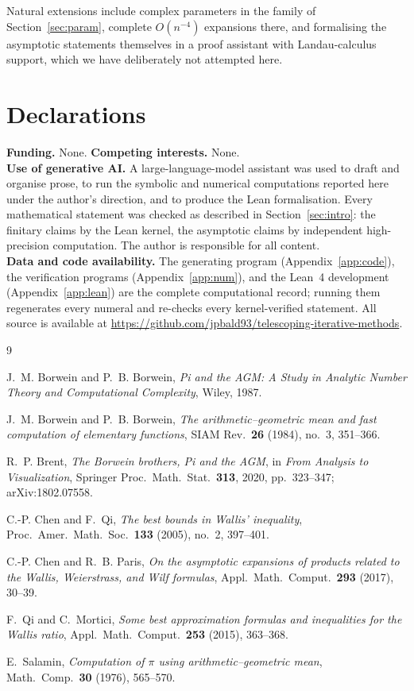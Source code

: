 \documentclass[11pt]{article}
\theoremstyle{plain}
\theoremstyle{remark}
\begin{document}
Natural extensions include complex parameters in the family of
Section~\ref{sec:param}, complete $O(n^{-4})$ expansions there, and formalising
the asymptotic statements themselves in a proof assistant with Landau-calculus
support, which we have deliberately not attempted here.

\section*{Declarations}
\noindent\textbf{Funding.} None. \quad\textbf{Competing interests.} None.\\
\textbf{Use of generative AI.} A large-language-model assistant was used to
draft and organise prose, to run the symbolic and numerical computations
reported here under the author's direction, and to produce the Lean
formalisation. Every mathematical statement was checked as described in
Section~\ref{sec:intro}: the finitary claims by the Lean kernel, the asymptotic
claims by independent high-precision computation. The author is responsible for
all content.\\
\textbf{Data and code availability.} The generating program
(Appendix~\ref{app:code}), the verification programs (Appendix~\ref{app:num}),
and the Lean~4 development (Appendix~\ref{app:lean}) are the complete
computational record; running them regenerates every numeral and re-checks every
kernel-verified statement. All source is available at
\url{https://github.com/jpbald93/telescoping-iterative-methods}.

\begin{thebibliography}{9}

 J.~M. Borwein and P.~B. Borwein, \emph{Pi and the AGM: A
Study in Analytic Number Theory and Computational Complexity}, Wiley, 1987.

 J.~M. Borwein and P.~B. Borwein, \emph{The
arithmetic--geometric mean and fast computation of elementary functions}, SIAM
Rev.\ \textbf{26} (1984), no.~3, 351--366.

 R.~P. Brent, \emph{The Borwein brothers, Pi and the AGM},
in \emph{From Analysis to Visualization}, Springer Proc.\ Math.\ Stat.\
\textbf{313}, 2020, pp.~323--347; arXiv:1802.07558.

 C.-P. Chen and F.~Qi, \emph{The best bounds in Wallis'
inequality}, Proc.\ Amer.\ Math.\ Soc.\ \textbf{133} (2005), no.~2, 397--401.

 C.-P. Chen and R.~B. Paris, \emph{On the asymptotic
expansions of products related to the Wallis, Weierstrass, and Wilf formulas},
Appl.\ Math.\ Comput.\ \textbf{293} (2017), 30--39.

 F.~Qi and C.~Mortici, \emph{Some best approximation formulas
and inequalities for the Wallis ratio}, Appl.\ Math.\ Comput.\ \textbf{253}
(2015), 363--368.

 E.~Salamin, \emph{Computation of $\pi$ using
arithmetic--geometric mean}, Math.\ Comp.\ \textbf{30} (1976), 565--570.

\end{thebibliography}
\end{document}
